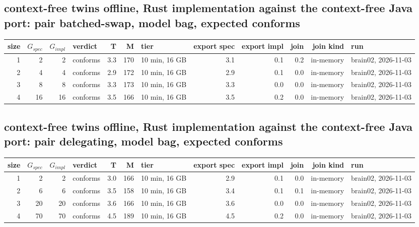 \documentclass[10pt]{article}
\begin{document}
\subsection*{context-free twins offline, Rust implementation against the context-free Java port: pair \textsf{batched-swap}, model bag, expected conforms}
\begin{longtable}{@{}rrrlrrlrrrrl@{}}
\toprule
size & $G_{\mathit{spec}}$ & $G_{\mathit{impl}}$ & verdict & T & M & tier & export spec & export impl & join & join kind & run \\
\midrule
\endhead
\color{red} 1 & 2 & 2 & conforms & 3.3 & 170 & 10 min, 16 GB & 3.1 & 0.1 & 0.2 & in-memory & brain02, 2026-11-03 \\
\color{red} 2 & 4 & 4 & conforms & 2.9 & 172 & 10 min, 16 GB & 2.9 & 0.1 & 0.0 & in-memory & brain02, 2026-11-03 \\
\color{red} 3 & 8 & 8 & conforms & 3.3 & 173 & 10 min, 16 GB & 3.3 & 0.0 & 0.0 & in-memory & brain02, 2026-11-03 \\
\color{red} 4 & 16 & 16 & conforms & 3.5 & 166 & 10 min, 16 GB & 3.5 & 0.2 & 0.0 & in-memory & brain02, 2026-11-03 \\
\bottomrule
\end{longtable}
\subsection*{context-free twins offline, Rust implementation against the context-free Java port: pair \textsf{delegating}, model bag, expected conforms}
\begin{longtable}{@{}rrrlrrlrrrrl@{}}
\toprule
size & $G_{\mathit{spec}}$ & $G_{\mathit{impl}}$ & verdict & T & M & tier & export spec & export impl & join & join kind & run \\
\midrule
\endhead
\color{red} 1 & 2 & 2 & conforms & 3.0 & 166 & 10 min, 16 GB & 2.9 & 0.1 & 0.0 & in-memory & brain02, 2026-11-03 \\
\color{red} 2 & 6 & 6 & conforms & 3.5 & 158 & 10 min, 16 GB & 3.4 & 0.1 & 0.1 & in-memory & brain02, 2026-11-03 \\
\color{red} 3 & 20 & 20 & conforms & 3.6 & 166 & 10 min, 16 GB & 3.6 & 0.0 & 0.0 & in-memory & brain02, 2026-11-03 \\
\color{red} 4 & 70 & 70 & conforms & 4.5 & 189 & 10 min, 16 GB & 4.5 & 0.2 & 0.0 & in-memory & brain02, 2026-11-03 \\
\bottomrule
\end{longtable}
\end{document}
